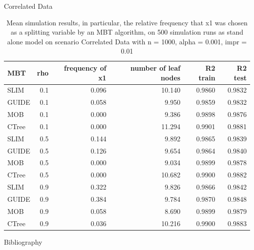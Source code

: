 \documentclass[9pt, xcolor=table]{beamer}
\begin{document}
\begin{frame}{Correlated Data}
\begin{table}

\caption{Mean simulation results, in particular, the relative frequency that x1 was chosen as a splitting variable by an MBT algorithm, on 500 simulation runs as stand alone model on scenario Correlated Data with n = 1000, alpha = 0.001, impr = 0.01}
\centering
\begin{tabular}[t]{l|r|r|r|r|r}
\hline
MBT & rho & frequency of x1  & number of leaf nodes & R2 train & R2 test\\
\hline
SLIM & 0.1 & 0.096 & 10.140 & 0.9860 & 0.9832\\
\hline
GUIDE & 0.1 & 0.058 & 9.950 & 0.9859 & 0.9832\\
\hline
MOB & 0.1 & 0.000 & 9.386 & 0.9898 & 0.9876\\
\hline
CTree & 0.1 & 0.000 & 11.294 & 0.9901 & 0.9881\\
\hline
SLIM & 0.5 & 0.144 & 9.892 & 0.9865 & 0.9839\\
\hline
GUIDE & 0.5 & 0.126 & 9.654 & 0.9864 & 0.9840\\
\hline
MOB & 0.5 & 0.000 & 9.034 & 0.9899 & 0.9878\\
\hline
CTree & 0.5 & 0.000 & 10.682 & 0.9900 & 0.9882\\
\hline
SLIM & 0.9 & 0.322 & 9.826 & 0.9866 & 0.9842\\
\hline
GUIDE & 0.9 & 0.384 & 9.784 & 0.9870 & 0.9848\\
\hline
MOB & 0.9 & 0.058 & 8.690 & 0.9899 & 0.9879\\
\hline
CTree & 0.9 & 0.036 & 10.216 & 0.9900 & 0.9883\\
\hline
\end{tabular}
\end{table}    
\end{frame}


\begin{frame}{Bibliography}
    
    

\end{frame}
\end{document}
